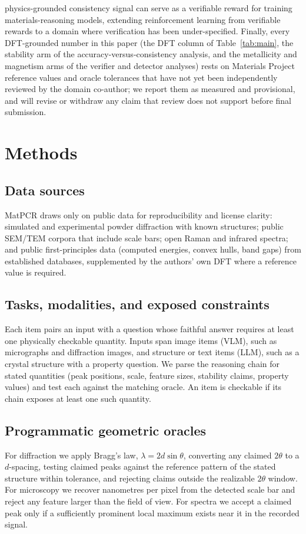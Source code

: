 \documentclass[pdflatex,sn-nature]{sn-jnl}
\begin{document}
physics-grounded consistency signal can serve as a verifiable reward for training
materials-reasoning models, extending reinforcement learning from verifiable rewards
to a domain where verification has been under-specified.\cite{scirlvr2026} Finally,
every DFT-grounded number in this paper (the DFT column of Table~\ref{tab:main}, the
stability arm of the accuracy-versus-consistency analysis, and the metallicity and
magnetism arms of the verifier and detector analyses) rests on Materials Project
reference values and oracle tolerances that have not yet been independently reviewed
by the domain co-author; we report them as measured and provisional, and will revise
or withdraw any claim that review does not support before final submission.

\section*{Methods}
\subsection*{Data sources}
MatPCR draws only on public data for reproducibility and license clarity: simulated
and experimental powder diffraction with known structures;\cite{simxrd2024,opxrd2025}
public SEM/TEM corpora that include scale bars; open Raman and infrared spectra; and
public first-principles data (computed energies, convex hulls, band gaps) from
established databases,\cite{matproj2013} supplemented by the authors' own DFT where a
reference value is required.

\subsection*{Tasks, modalities, and exposed constraints}
Each item pairs an input with a question whose faithful answer requires at least one
physically checkable quantity. Inputs span image items (VLM), such as micrographs and
diffraction images, and structure or text items (LLM), such as a crystal structure
with a property question. We parse the reasoning chain for stated quantities (peak
positions, scale, feature sizes, stability claims, property values) and test each
against the matching oracle. An item is checkable if its chain exposes at least one
such quantity.

\subsection*{Programmatic geometric oracles}
For diffraction we apply Bragg's law, $\lambda = 2 d \sin\theta$, converting any
claimed $2\theta$ to a $d$-spacing, testing claimed peaks against the reference
pattern of the stated structure within tolerance, and rejecting claims outside the
realizable $2\theta$ window. For microscopy we recover nanometres per pixel from the
detected scale bar and reject any feature larger than the field of view. For spectra
we accept a claimed peak only if a sufficiently prominent local maximum exists near
it in the recorded signal.
\end{document}
